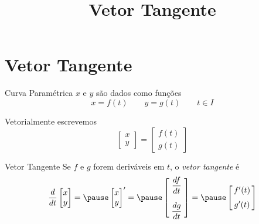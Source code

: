 
\usepackage{calculo_varias_variaveis-1}

\title{Vetor Tangente}



\addtitle

\section{Vetor Tangente}

\begin{frame}{Curva Paramétrica}
  $x$ e $y$ são dados como funções
  \[
    x = f(t)     \qquad
    y = g(t)     \qquad
    t \in I
  \]

  \pause
  Vetorialmente escrevemos
  \[
    \begin{bmatrix}  x    \\ y    \end{bmatrix} =
    \begin{bmatrix}  f(t) \\ g(t) \end{bmatrix}
  \]
\end{frame}

\begin{frame}{Vetor Tangente}
  Se $f$ e $g$ forem deriváveis em $t$, o \emph{vetor tangente} é
  \pause
  \[
    \frac{d}{dt}\begin{bmatrix}  x    \\ y    \end{bmatrix} =
    \pause
    \begin{bmatrix}  x    \\ y    \end{bmatrix}' =
    \pause
    \begin{bmatrix} \;\dfrac{df}{dt}\;\null \\[5mm] \;\dfrac{dg}{dt}\;\null \end{bmatrix} =
    \pause
    \begin{bmatrix} \,f'(t)\,\null \\[2mm] \,g'(t)\,\null \end{bmatrix}
  \]
\end{frame}

